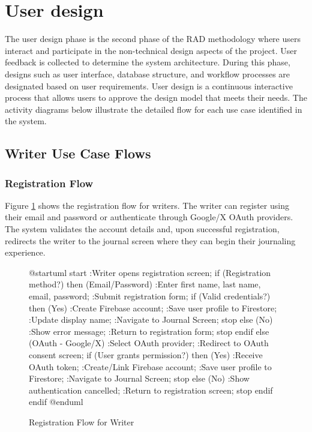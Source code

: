 \section{User design}\label{sec:userDesign}

The user design phase is the second phase of the RAD methodology where users interact and participate in the non-technical design aspects of the project. User feedback is collected to determine the system architecture. During this phase, designs such as user interface, database structure, and workflow processes are designated based on user requirements. User design is a continuous interactive process that allows users to approve the design model that meets their needs. The activity diagrams below illustrate the detailed flow for each use case identified in the system.

\subsection{Writer Use Case Flows}\label{subsec:writerFlows}

\subsubsection{Registration Flow}\label{subsubsec:registerFlow}

Figure \ref{fig:register-flow} shows the registration flow for writers. The writer can register using their email and password or authenticate through Google/X OAuth providers. The system validates the account details and, upon successful registration, redirects the writer to the journal screen where they can begin their journaling experience.

\begin{figure}[H]
\centering
\begin{plantuml}
@startuml
start
:Writer opens registration screen;
if (Registration method?) then (Email/Password)
  :Enter first name, last name, email, password;
  :Submit registration form;
  if (Valid credentials?) then (Yes)
    :Create Firebase account;
    :Save user profile to Firestore;
    :Update display name;
    :Navigate to Journal Screen;
    stop
  else (No)
    :Show error message;
    :Return to registration form;
    stop
  endif
else (OAuth - Google/X)
  :Select OAuth provider;
  :Redirect to OAuth consent screen;
  if (User grants permission?) then (Yes)
    :Receive OAuth token;
    :Create/Link Firebase account;
    :Save user profile to Firestore;
    :Navigate to Journal Screen;
    stop
  else (No)
    :Show authentication cancelled;
    :Return to registration screen;
    stop
  endif
endif
@enduml
\end{plantuml}
\caption{Registration Flow for Writer}
\label{fig:register-flow}
\end{figure}

